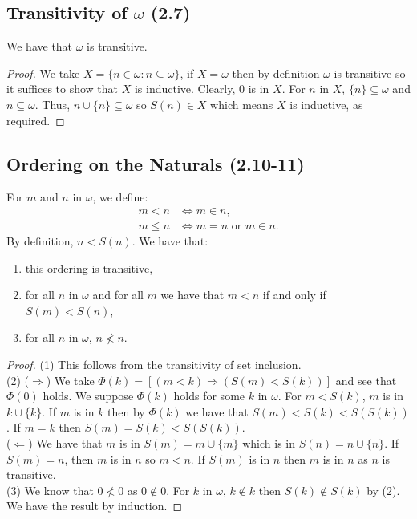 \subsection{Transitivity of $\omega$ (2.7)} \label{2.7}

We have that $\omega$ is transitive.

\begin{proof}
    We take $X = \{n \in \omega : n \subseteq \omega\}$, if $X = \omega$
    then by definition $\omega$ is transitive so it suffices to show that
    $X$ is inductive. Clearly, $0$ is in $X$. For $n$ in $X$, $\{n\} \subseteq \omega$
    and $n \subseteq \omega$. Thus, $n \cup \{n\} \subseteq \omega$ so $S(n) \in X$
    which means $X$ is inductive, as required.
\end{proof}

\subsection{Ordering on the Naturals (2.10-11)} \label{2.10} \label{2.11}

For $m$ and $n$ in $\omega$, we define: \begin{align*}
    m < n &\Longleftrightarrow m \in n, \\
    m \leq n &\Longleftrightarrow m = n \text{ or } m \in n.
\end{align*} By definition, $n < S(n)$. We have that: \begin{enumerate}
    \item this ordering is transitive,
    \item for all $n$ in $\omega$ and for all $m$ we have that
        $m < n$ if and only if $S(m) < S(n)$,
    \item for all $n$ in $\omega$, $n \nless n$.
\end{enumerate}

\begin{proof}
    (1) This follows from the transitivity of set inclusion.
    \\[\baselineskip]
    (2) ($\Longrightarrow$) We take $\Phi(k) = [(m < k) \Longrightarrow (S(m) < S(k))]$ and
    see that $\Phi(0)$ holds. We suppose $\Phi(k)$ holds for some
    $k$ in $\omega$. For $m < S(k)$, $m$ is in $k \cup \{k\}$. If $m$ 
    is in $k$ then by $\Phi(k)$ we have that $S(m) < S(k) < S(S(k))$.
    If $m = k$ then $S(m) = S(k) < S(S(k))$.
    \\[\baselineskip]
    ($\Longleftarrow$) We have that $m$ is in $S(m) = m \cup \{m\}$ which
    is in $S(n) = n \cup \{n\}$. If $S(m) = n$, then $m$ is in $n$
    so $m < n$. If $S(m)$ is in $n$ then $m$ is in $n$ as $n$ is
    transitive.
    \\[\baselineskip]
    (3) We know that $0 \nless 0$ as $0 \notin 0$. For $k$ in $\omega$,
    $k \notin k$ then $S(k) \notin S(k)$ by (2). We have the result 
    by induction.
\end{proof}

